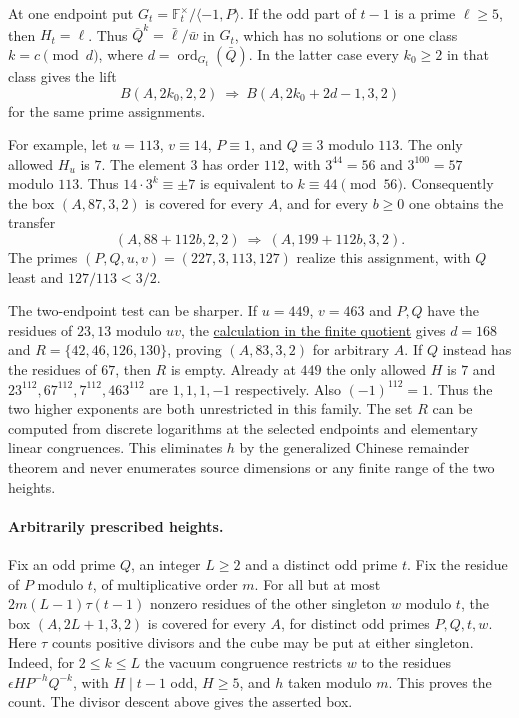\documentclass[11pt,a4paper]{article}
\numberwithin{equation}{section}
\theoremstyle{remark}
\DeclareMathOperator{\ord}{ord}
\begin{document}
At one endpoint put $G_t=\mathbb F_t^\times/\langle-1,P\rangle$.
If the odd part of $t-1$ is a prime $\ell\ge5$, then $H_t=\ell$.
Thus $\bar Q^k=\bar\ell/\bar w$ in $G_t$, which has no solutions
or one class $k=c\pmod d$, where $d=\ord_{G_t}(\bar Q)$.
In the latter case every $k_0\ge2$ in that class gives the lift
\[
 B(A,2k_0,2,2)\ \Longrightarrow\ B(A,2k_0+2d-1,3,2)
\]
for the same prime assignments.

For example, let $u=113$, $v\equiv14$, $P\equiv1$, and $Q\equiv3$
modulo $113$. The only allowed $H_u$ is $7$. The element $3$ has
order $112$, with $3^{44}=56$ and $3^{100}=57$ modulo $113$.
Thus $14\cdot3^k\equiv\pm7$ is equivalent to $k\equiv44\pmod {56}$.
Consequently the box $(A,87,3,2)$ is covered for every $A$, and
for every $b\ge0$ one obtains the transfer
\[
       (A,88+112b,2,2)\ \Longrightarrow\ (A,199+112b,3,2).
\]
The primes $(P,Q,u,v)=(227,3,113,127)$ realize this assignment,
with $Q$ least and $127/113<3/2$.

The two-endpoint test can be sharper. If $u=449$, $v=463$ and
$P,Q$ have the residues of $23,13$ modulo $uv$, the \href{https://github.com/sebastienpalcoux/WGT-fusion-categories/blob/main/code/four_primes/residue_classes.py}{calculation in the finite quotient} gives
$d=168$ and $R=\{42,46,126,130\}$, proving $(A,83,3,2)$ for
arbitrary $A$. If $Q$ instead has the residues of $67$, then $R$ is
empty. Already at $449$ the only allowed $H$ is $7$ and
$23^{112},67^{112},7^{112},463^{112}$ are $1,1,1,-1$ respectively. Also $(-1)^{112}=1$. Thus the two higher exponents are both
unrestricted in this family. The set $R$ can be computed from discrete logarithms
at the selected endpoints and elementary linear congruences. This
eliminates $h$ by the generalized Chinese remainder theorem and never
enumerates source dimensions or any finite range of the two heights.

\paragraph{Arbitrarily prescribed heights.}
Fix an odd prime $Q$, an integer $L\ge2$ and a distinct odd
prime $t$. Fix the residue of $P$ modulo $t$, of multiplicative
order $m$. For all but at most $2m(L-1)\tau(t-1)$ nonzero
residues of the other singleton $w$ modulo $t$, the box
$(A,2L+1,3,2)$ is covered for every $A$, for distinct odd
primes $P,Q,t,w$. Here $\tau$ counts positive divisors and the
cube may be put at either singleton. Indeed, for $2\le k\le L$
the vacuum congruence restricts $w$ to the residues
$\epsilon H P^{-h}Q^{-k}$, with $H\mid t-1$ odd, $H\ge5$,
and $h$ taken modulo $m$. This proves the count. The divisor
descent above gives the asserted box.
\end{document}

